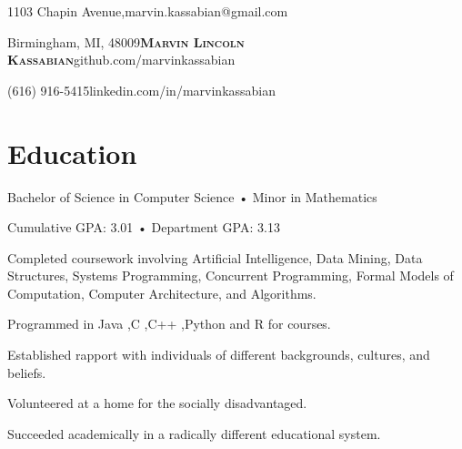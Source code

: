 \documentclass{marvinkassabian_resume}
\begin{document}
	{1103 Chapin Avenue,}\hfill{marvin.kassabian@gmail.com}
	
	{Birmingham, MI, 48009}\hfill{\Large{\textbf{\scshape{Marvin Lincoln Kassabian}}}}\hfill{github.com/marvinkassabian}

	{(616) 916-5415}\hfill{linkedin.com/in/marvinkassabian}


	\section{Education}
{Bachelor of Science in Computer Science • Minor in Mathematics}

{Cumulative GPA: 3.01 • Department GPA: 3.13}
			\resumesublistbegin
				\item Completed coursework involving Artificial Intelligence, Data Mining, Data Structures, Systems Programming,
Concurrent Programming, Formal Models of Computation, Computer Architecture, and Algorithms.
				\item Programmed in Java ,C ,C++ ,Python and R for courses.
			\resumesublistend
			\resumesublistbegin
				\item Established rapport with individuals of different backgrounds, cultures, and beliefs.
				\item Volunteered at a home for the socially disadvantaged.
				\item Succeeded academically in a radically different educational system.
			\resumesublistend
\end{document}

